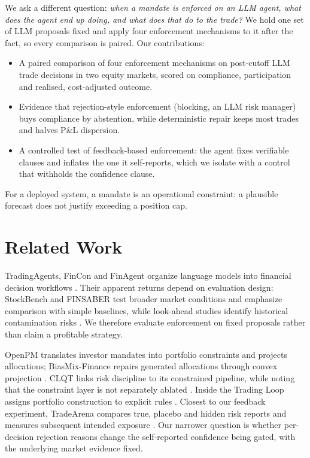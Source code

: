 \documentclass[letterpaper]{article} %
\begin{document}
We ask a different question: \emph{when a mandate is enforced on an LLM agent, what does the agent end up doing, and what does that do to the trade?} We hold one set of LLM proposals fixed and apply four enforcement mechanisms to it after the fact, so every comparison is paired. Our contributions:
\begin{itemize}
\item A paired comparison of four enforcement mechanisms on \NPersona{} post-cutoff LLM trade decisions in two equity markets, scored on compliance, participation and realised, cost-adjusted outcome.
\item Evidence that rejection-style enforcement (blocking, an LLM risk manager) buys compliance by abstention, while deterministic repair keeps most trades and halves P\&L dispersion.
\item A controlled test of feedback-based enforcement: the agent fixes verifiable clauses and inflates the one it self-reports, which we isolate with a control that withholds the confidence clause.
\end{itemize}
For a deployed system, a mandate is an operational constraint: a plausible forecast does not justify exceeding a position cap.

\section{Related Work}
TradingAgents, FinCon and FinAgent organize language models into financial decision workflows \citep{xiao2024tradingagents,yu2024fincon,zhang2024finagent}. Their apparent returns depend on evaluation design: StockBench and FINSABER test broader market conditions and emphasize comparison with simple baselines, while look-ahead studies identify historical contamination risks \citep{chen2025stockbench,li2025finsaber,gao2025lookahead}. We therefore evaluate enforcement on fixed proposals rather than claim a profitable strategy.

OpenPM translates investor mandates into portfolio constraints and projects allocations; BiasMix-Finance repairs generated allocations through convex projection \citep{cai2026openpm,kukreja2026biasmix}. CLQT links risk discipline to its constrained pipeline, while noting that the constraint layer is not separately ablated \citep{qu2026clqt}. Inside the Trading Loop assigns portfolio construction to explicit rules \citep{tradingloop2026}. Closest to our feedback experiment, TradeArena compares true, placebo and hidden risk reports and measures subsequent intended exposure \citep{xue2026tradearena}. Our narrower question is whether per-decision rejection reasons change the self-reported confidence being gated, with the underlying market evidence fixed.
\end{document}
